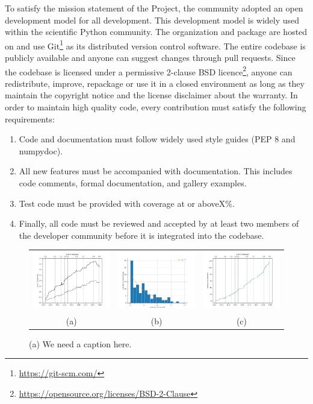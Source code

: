 To satisfy the mission statement of the Project, the \sunpy community adopted an open development model for all development. 
This development model is widely used within the scientific Python community. 
The \sunpy organization and \sunpypkg package are hosted on \github and use Git\footnote{\url{https://git-scm.com/}} as its distributed version control software.
The entire codebase is publicly available and anyone can suggest changes through pull requests. 
Since the codebase is licensed under a permissive 2-clause BSD licence\footnote{\url{https://opensource.org/licenses/BSD-2-Clause}}, anyone can redistribute, improve, repackage or use it in a closed environment as long as they maintain the copyright notice and the license disclaimer about the warranty. 
In order to maintain high quality code, every contribution must satisfy the following requirements:
\begin{enumerate}
    \item Code and documentation must follow widely used style guides (PEP 8 and numpydoc).
    \item All new features must be accompanied with documentation. 
    This includes code comments, formal documentation, and gallery examples.
    \item Test code must be provided with coverage at or aboveX\%.
    \item Finally, all code must be reviewed and accepted by at least two members of the developer community before it is integrated into the codebase.
\end{enumerate}

\begin{figure}
\begin{tabular}{ccc}
  \includegraphics[width=45mm]{figures/sunpy_history.pdf} &
  \includegraphics[width=45mm]{figures/busfactor_plot.pdf} &   
  \includegraphics[width=45mm]{figures/cumulative_authors.pdf} \\
(a) & (b) & (c) \\
\end{tabular}
\caption{(a) We need a caption here. }
\label{fig:image2}
\end{figure}
